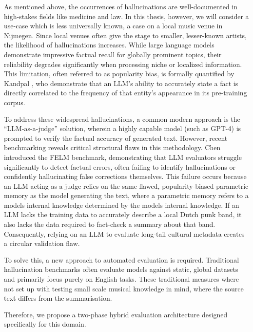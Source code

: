 As mentioned above, the occurrences of hallucinations are well-documented in high-stakes fields like medicine and law. 
In this thesis, however, we will consider a use-case which is less universally known, a case on a local music venue in Nijmegen. 
Since local venues often give the stage to smaller, lesser-known artists, the likelihood of hallucinations increases. While large language models demonstrate impressive factual recall for globally prominent topics, their reliability degrades significantly when processing niche or localized information. This limitation, often referred to as popularity bias, is formally quantified by Kandpal \etal \cite{kandpal2023longtail}, who demonstrate that an LLM's ability to accurately state a fact is directly correlated to the frequency of that entity's appearance in its pre-training corpus.

To address these widespread hallucinations, a common modern approach is the ``LLM-as-a-judge'' solution, wherein a highly capable model (such as GPT-4) is prompted to verify the factual accuracy of generated text. However, recent benchmarking reveals critical structural flaws in this methodology. Chen \etal \cite{chen2023felm} introduced the FELM benchmark, demonstrating that LLM evaluators struggle significantly to detect factual errors, often failing to identify hallucinations or confidently hallucinating false corrections themselves. This failure occurs because an LLM acting as a judge relies on the same flawed, popularity-biased parametric memory as the model generating the text, where a parametric memory refers to a models internal knowledge determined by the models internal knowledge. If an LLM lacks the training data to accurately describe a local Dutch punk band, it also lacks the data required to fact-check a summary about that band. Consequently, relying on an LLM to evaluate long-tail cultural metadata creates a circular validation flaw.

To solve this, a new approach to automated evaluation is required. Traditional hallucination benchmarks often evaluate models against static, global datasets and primarily focus purely on English tasks. 
These traditional measures where not set up with testing small scale musical knowledge in mind, where the source text differs from the summarisation. 

Therefore, we propose a two-phase hybrid evaluation architecture designed specifically for this domain.


